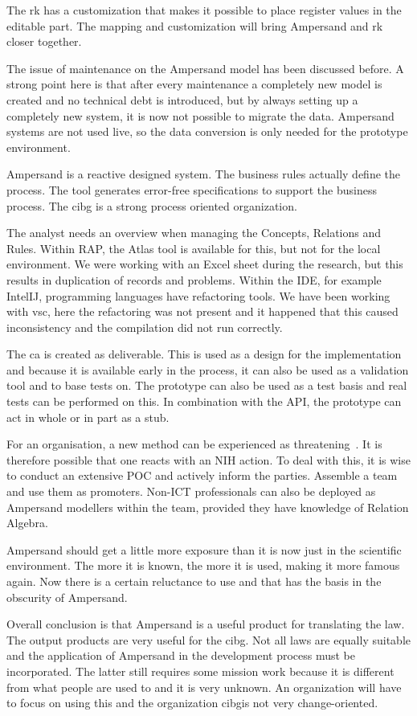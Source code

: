 The \acrshort{rk} has a customization that makes it possible to place register values in the editable part.
The mapping and customization will bring Ampersand and \acrshort{rk} closer together.

The issue of maintenance on the Ampersand model has been discussed before.
A strong point here is that after every maintenance a completely new model is created and no technical debt is introduced, but by always setting up a completely new system, it is now not possible to migrate the data.
Ampersand systems are not used live, so the data conversion is only needed for the prototype environment.

Ampersand is a reactive designed system.
The business rules actually define the process.
The tool generates error-free specifications to support the business process.
The \acrshort{cibg} is a strong process oriented organization.

The analyst needs an overview when managing the Concepts, Relations and Rules.
Within RAP, the Atlas tool is available for this, but not for the local environment.
We were working with an Excel sheet during the research, but this results in duplication of records and problems.
Within the IDE, for example IntelIJ, programming languages have refactoring tools.
We have been working with \acrshort{vsc}, here the refactoring was not present and it happened that this caused inconsistency and the compilation did not run correctly.

The \acrlong{ca} is created as deliverable.
This is used as a design for the implementation and because it is available early in the process, it can also be used as a validation tool and to base tests on.
The prototype can also be used as a test basis and real tests can be performed on this.
In combination with the API, the prototype can act in whole or in part as a stub.

For an organisation, a new method can be experienced as threatening~\citep{antons_assessing_2017}.
It is therefore possible that one reacts with an NIH action.
To deal with this, it is wise to conduct an extensive POC and actively inform the parties.
Assemble a team and use them as promoters.
Non-ICT professionals can also be deployed as Ampersand modellers within the team, provided they have knowledge of Relation Algebra.

Ampersand should get a little more exposure than it is now just in the scientific environment.
The more it is known, the more it is used, making it more famous again.
Now there is a certain reluctance to use and that has the basis in the obscurity of Ampersand.

Overall conclusion is that Ampersand is a useful product for translating the law.
The output products are very useful for the \acrshort{cibg}.
Not all laws are equally suitable and the application of Ampersand in the development process must be incorporated.
The latter still requires some mission work because it is different from what people are used to and it is very unknown.
An organization will have to focus on using this and the organization \acrshort{cibg}is not very change-oriented.